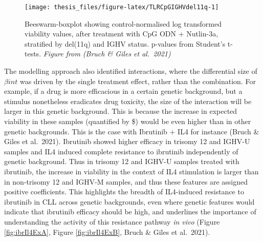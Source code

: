 \documentclass[11pt, a4paper, twosided]{book}
\begin{document}
\begin{figure}

{\centering \texttt{[image: thesis\_files/figure-latex/TLRCpGIGHVdel11q-1]} 

}

\caption{Beeswarm-boxplot showing control-normalised log transformed viability values, after treatment with CpG ODN + Nutlin-3a, stratified by del(11q) and IGHV status. p-values from Student's t-tests. \emph{Figure from (Bruch \& Giles et al.~2021)}}\label{fig:TLRCpGIGHVdel11q}
\end{figure}
The modelling approach also identified interactions, where the differential size of \(\beta{int}\) was driven by the single treatment effect, rather than the combination. For example, if a drug is more efficacious in a certain genetic background, but a stimulus nonetheless eradicates drug toxicity, the size of the interaction will be larger in this genetic background. This is because the increase in expected viability in these samples (quantified by \$) would be even higher than in other genetic backgrounds. This is the case with Ibrutinib + IL4 for instance (Bruch \& Giles et al.~2021). Ibrutinib showed higher efficacy in trisomy 12 and IGHV-U samples and IL4 induced complete resistance to ibrutinib independently of genetic background. Thus in trisomy 12 and IGHV-U samples treated with ibrutinib, the increase in viability in the context of IL4 stimulation is larger than in non-trisomy 12 and IGHV-M samples, and thus these features are assigned positive coefficients. This highlights the breadth of IL4-induced resistance to ibrutinib in CLL across genetic backgrounds, even where genetic features would indicate that ibrutinib efficacy should be high, and underlines the importance of understanding the activity of this resistance pathway \emph{in vivo} (Figure \ref{fig:ibrIl4ExA}, Figure \ref{fig:ibrIl4ExB}, Bruch \& Giles et al.~2021).
\end{document}
